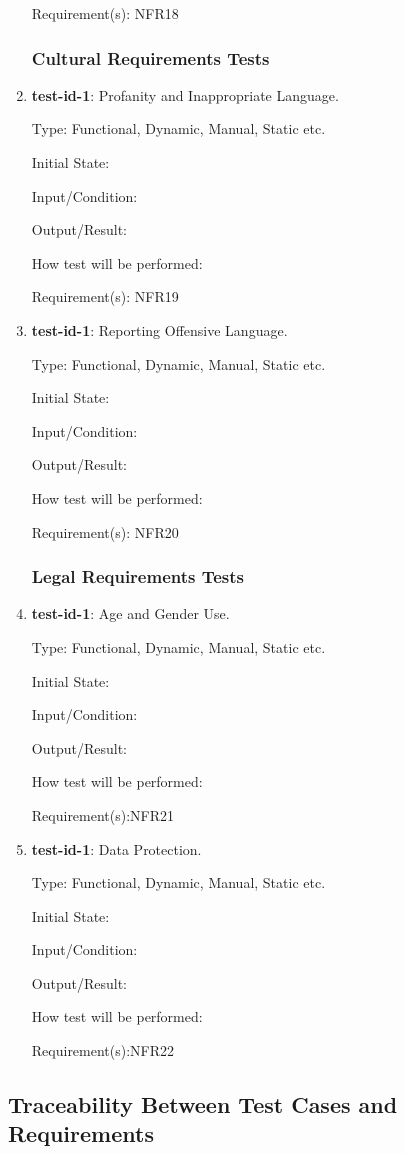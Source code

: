 \documentclass[12pt, titlepage]{article}
\begin{document}
\begin{enumerate}
		Requirement(s): NFR18
	\subsubsection{Cultural Requirements Tests}
		\item{\textbf{test-id-1}}: Profanity and Inappropriate Language.
		
		Type: Functional, Dynamic, Manual, Static etc.
		
		Initial State: 
		
		Input/Condition: 
		
		Output/Result: 
		
		How test will be performed: 
		
		Requirement(s): NFR19
		
		\item{\textbf{test-id-1}}: Reporting Offensive Language.
		
		Type: Functional, Dynamic, Manual, Static etc.
		
		Initial State: 
		
		Input/Condition: 
		
		Output/Result: 
		
		How test will be performed: 
		
		Requirement(s): NFR20
	\subsubsection{Legal Requirements Tests}
		\item{\textbf{test-id-1}}: Age and Gender Use.
		
		Type: Functional, Dynamic, Manual, Static etc.
		
		Initial State: 
		
		Input/Condition: 
		
		Output/Result: 
		
		How test will be performed: 
		
		Requirement(s):NFR21
		\item{\textbf{test-id-1}}: Data Protection.
		
		Type: Functional, Dynamic, Manual, Static etc.
		
		Initial State: 
		
		Input/Condition: 
		
		Output/Result: 
		
		How test will be performed: 
		
		Requirement(s):NFR22
	\end{enumerate}
	\subsection{Traceability Between Test Cases and Requirements}
	
\end{document}
